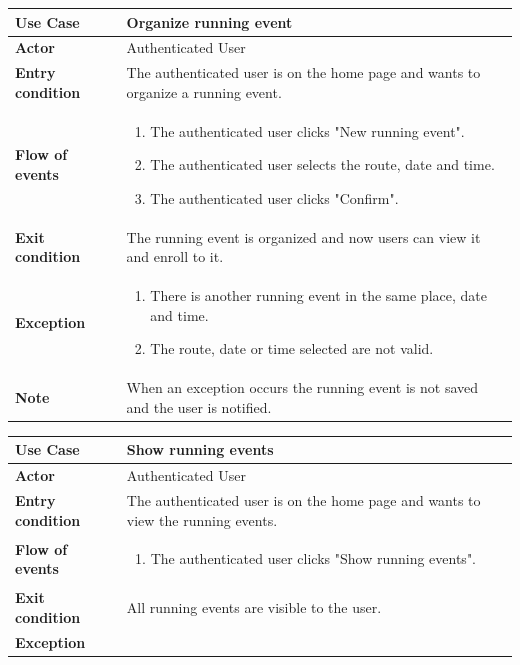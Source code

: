\documentclass[../main.tex]{subfiles}
\begin{document}
	\begin{center}
		\begin{tabular}{p{3cm}p{8.28cm}}
			\hline
			\textbf{Use Case} & Organize running event\\
			\hline
			\textbf{Actor} & Authenticated User\\
			\hline
			\textbf{Entry condition} & The authenticated user is on the home page and wants to organize a running event.\\
			\hline
			\textbf{Flow of events} & \begin{enumerate}
				\linespread{0}\item The authenticated user clicks "New running event".
				\linespread{0}\item The authenticated user selects the route, date and time.
				\linespread{0}\item The authenticated user clicks "Confirm".
			\end{enumerate}\\
			\hline
			\textbf{Exit condition} & The running event is organized and now users can view it and enroll to it.\\
			\hline
			\textbf{Exception} & \begin{enumerate}
				\linespread{0}\item There is another running event in the same place, date and time.
				\linespread{0}\item The route, date or time selected are not valid.
			\end{enumerate}\\
			\hline
			\textbf{Note} & When an exception occurs the running event is not saved and the user is notified.\\
			\hline
		\end{tabular}
	\end{center}
	\vspace*{3cm}
	\begin{center}
		\begin{tabular}{p{3cm}p{8.28cm}}
			\hline
			\textbf{Use Case} & Show running events\\
			\hline
			\textbf{Actor} & Authenticated User\\
			\hline
			\textbf{Entry condition} & The authenticated user is on the home page and wants to view the running events.\\
			\hline
			\textbf{Flow of events} & \begin{enumerate}
				\linespread{0}\item The authenticated user clicks "Show running events".
			\end{enumerate}\\
			\hline
			\textbf{Exit condition} & All running events are visible to the user.\\
			\hline
			\textbf{Exception}\\
			\hline
		\end{tabular}
	\end{center}
\end{document}
